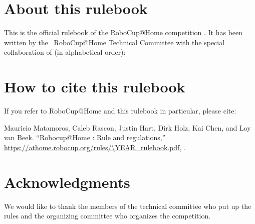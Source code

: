 


\section*{About this rulebook}
This is the official rulebook of the RoboCup@Home competition \YEAR.
It has been written by the \YEAR ~RoboCup@Home Technical Committee with the special collaboration of (in alphabetical order):



\section*{How to cite this rulebook}
If you refer to RoboCup@Home and this rulebook in particular, please cite:

Mauricio Matamoros, Caleb Rascon, Justin Hart, Dirk Holz, Kai Chen, and Loy van Beek.
\enquote{Robocup@Home \YEAR: Rule and regulations,}
\url{https://athome.robocup.org/rules/\YEAR_rulebook.pdf}, \YEAR.

\begin{center}
\begin{minipage}{0.8\textwidth}
	\footnotesize%
	
\end{minipage}
\end{center}

\section*{Acknowledgments}
\label{sec:acknowledgments}
We would like to thank the members of the technical committee who put up the rules and the organizing committee who organizes the competition.

